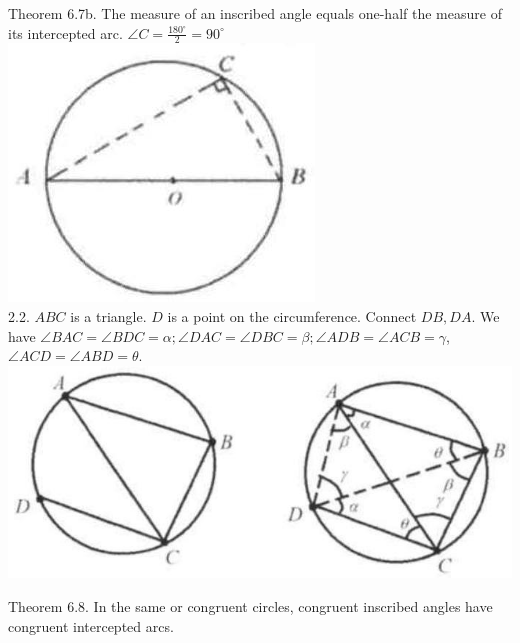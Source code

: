 \documentclass{article}
\begin{document}
Theorem 6.7b. The measure of an inscribed angle equals one-half the measure of its intercepted arc. \(\angle C=\frac{180^{\circ}}{2}=90^{\circ}\)\\
\centering
\includegraphics[width=\textwidth]{images/162.jpg}\\
2.2. \(A B C\) is a triangle. \(D\) is a point on the circumference. Connect \(D B, D A\). We have \(\angle B A C=\angle B D C=\alpha ; \angle D A C=\angle D B C=\beta ; \angle A D B=\angle A C B=\gamma\), \(\angle A C D=\angle A B D=\theta\).\\
\centering
\includegraphics[width=\textwidth]{images/162(2).jpg}

Theorem 6.8. In the same or congruent circles, congruent inscribed angles have congruent intercepted arcs.
\end{document}
